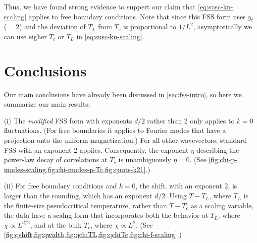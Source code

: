 Thus, we have found strong evidence to suppert our claim that
\cref{eq:susc-kn-scaling} applies to free boundary conditions. Note that
since this FSS form uses $y_t$ ($=2$) and the deviation of $T_L$ from $T_c$ is
proportional to $1/L^2$, asymptotically we can use eigher $T_c$ or $T_L$ in
\cref{eq:susc-kn-scaling}.


\section{Conclusions}

Our main conclusions have already been discussed in \cref{sec:fss-intro}, so
here we summarize our main results:

(i) The \emph{modified} FSS form with exponents $d/2$ rather than 2 only
applies to $k=0$ fluctuations. (For free boundaries it applies to Fourier modes
that have a projection onto the uniform magnetization.) For all other
wavevectors, standard FSS with an exponent 2 applies. Consequently, the
exponent $\eta$ describing the power-law decay of correlations at $T_c$ is
unambiguously $\eta=0$.
(See \cref{fig:chi-p-modes-scaling,fig:chi-modes-p-Tc,fig:quots-k21}.)

(ii) For free boundary conditions and $k=0$, the shift, with an exponent 2, is
larger than the rounding, which has an exponent $d/2$. Using $T-T_L$, where
$T_L$ is the finite-size pseudocritical temperature, rather than $T-T_c$ as a
scaling variable, the data have a scalng form that incorporates both the
behavior at $T_L$, where $\chi \propto L^{d/2}$, and at the bulk $T_c$, where
$\chi \propto L^2$.
(See \cref{fig:qshift,fig:qwidth,fig:qchiTL,fig:qchiTc,fig:chi-f-scaling}.)



\label{sec:fss-conclusions}
